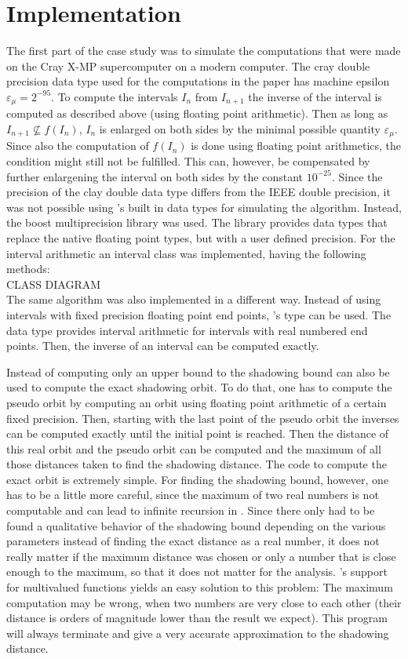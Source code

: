 \section{Implementation}
  The first part of the case study was to simulate the computations that were made on the Cray X-MP supercomputer on a modern computer. 
  The cray double precision data type used for the computations in the paper has machine epsilon $\varepsilon_\mu = 2^{-95}$.
  To compute the intervals $I_n$ from $I_{n+1}$ the inverse of the interval is computed as described above (using floating point arithmetic).
  Then as long as $I_{n+1} \not \subseteq f(I_n)$, $I_n$ is enlarged on both sides by the minimal possible quantity $\varepsilon_\mu$. 
  Since also the computation of $f(I_n)$ is done using floating point arithmetics, the condition might still not be fulfilled.
  This can, however, be compensated by further enlargening the interval on both sides by the constant $10^{-25}$.
  Since the precision of the clay double data type differs from the IEEE double precision, it was not possible using \cc's built in data types for simulating the algorithm.
  Instead, the boost multiprecision library \cite{boostmultiprecision} was used. 
  The library provides data types that replace the native \cc floating point types, but with a user defined precision. 
  For the interval arithmetic an interval class was implemented, having the following methods:\\
  CLASS DIAGRAM \\
  The same algorithm was also implemented in a different way. 
  Instead of using intervals with fixed precision floating point end points, \irram's  type can be used. 
  The data type provides interval arithmetic for intervals with real numbered end points.
  Then, the inverse of an interval can be computed exactly.
  
  Instead of computing only an upper bound to the shadowing bound \irram can also be used to compute the exact shadowing orbit. 
  To do that, one has to compute the pseudo orbit by computing an orbit using floating point arithmetic of a certain fixed precision.
  Then, starting with the last point of the pseudo orbit the inverses can be computed exactly until the initial point is reached.
  Then the distance of this real orbit and the pseudo orbit can be computed and the maximum of all those distances taken to find the shadowing distance.
  The \irram code to compute the exact orbit is extremely simple.
  For finding the shadowing bound, however, one has to be a little more careful, since the maximum of two real numbers is not computable and can lead to infinite recursion in \irram. 
  Since there only had to be found a qualitative behavior of the shadowing bound depending on the various parameters instead of finding the exact distance as a real number, it does not really matter if the maximum distance was chosen or only a number that is close enough to the maximum, so that it does not matter for the analysis. 
  \irram's support for multivalued functions yields an easy solution to this problem: 
  The maximum computation may be wrong, when two numbers are very close to each other (their distance is orders of magnitude lower than the result we expect). 
  This program will always terminate and give a very accurate approximation to the shadowing distance.  
